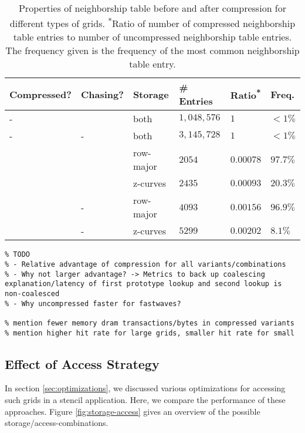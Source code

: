 \begin{table}
	\begin{tabular}{l l l l l l}
		\hline
		Compressed? & Chasing? & Storage & \# Entries & Ratio\textsuperscript{*} & Freq.\textsuperscript{\dag} \\
		\hline
		- & \checkmark & both & $1,048,576$ & $1$ & $<1\%$\\
		- & - & both & $3,145,728$ & $1$ & $<1\%$\\
		\checkmark & \checkmark & row-major & $2054$ & $0.00078$ & $97.7\%$ \\
		\checkmark & \checkmark & z-curves & $2435$ & $0.00093$ & $20.3\%$ \\
		\checkmark & - & row-major & $4093$ & $0.00156$ & $96.9\%$ \\
		\checkmark & - & z-curves & $5299$ & $0.00202$ & $8.1\%$ \\
		\hline
	\end{tabular}
	\caption{\label{tab:compression} Properties of neighborship table before and after compression for different types of grids. \textsuperscript{*}Ratio of number of compressed neighborship table entries to number of uncompressed neighborship table entries. \textsuperscript{\dag}The frequency given is the frequency of the most common neighborship table entry. }
\end{table}

\begin{verbatim}
% TODO
% - Relative advantage of compression for all variants/combinations
% - Why not larger advantage? -> Metrics to back up coalescing explanation/latency of first prototype lookup and second lookup is non-coalesced
% - Why uncompressed faster for fastwaves?

% mention fewer memory dram transactions/bytes in compressed variants
% mention higher hit rate for large grids, smaller hit rate for small
\end{verbatim}

\subsection{Effect of Access Strategy} \label{sec:res-access}

In section \ref{sec:optimizations}, we discussed various optimizations for accessing such grids in a stencil application. Here, we compare the performance of these approaches. Figure \ref{fig:storage-access} gives an overview of the possible storage/access-combinations.

